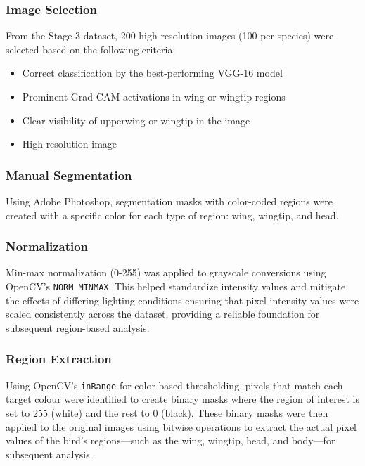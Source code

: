 \documentclass[a4paper,12pt]{report}
\begin{document}
\subsubsection{Image Selection}
From the Stage 3 dataset, 200 high-resolution images (100 per species) were selected based on the following criteria:
\begin{itemize}
\item Correct classification by the best-performing VGG-16 model
\item Prominent Grad-CAM activations in wing or wingtip regions
\item Clear visibility of upperwing or wingtip in the image
\item High resolution image
\end{itemize}

\subsubsection{Manual Segmentation}
Using Adobe Photoshop, segmentation masks with color-coded regions were created with a specific color for each type of region: wing, wingtip, and head.

\subsubsection{Normalization}
Min-max normalization\citep{monzon_image_normalization} (0-255) was applied to grayscale conversions using OpenCV's \texttt{NORM\_MINMAX}.
This helped standardize intensity values and mitigate the effects of differing lighting conditions ensuring that pixel intensity values were scaled consistently across the dataset, providing a reliable foundation for subsequent region-based analysis.

\subsubsection{Region Extraction}

Using OpenCV's \texttt{inRange} for color-based thresholding, pixels that match each target colour were identified to create binary masks where the region of interest is set to 255 (white) and the rest to 0 (black). These binary masks were then applied to the original images using bitwise operations to extract the actual pixel values of the bird's regions—such as the wing, wingtip, head, and body—for subsequent analysis.

\end{document}
